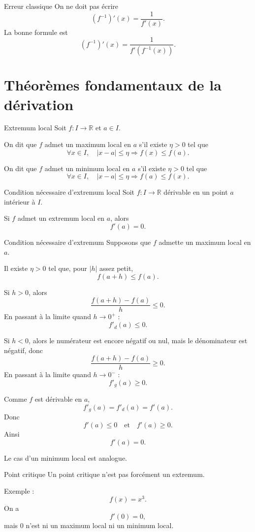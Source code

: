 \documentclass[11pt,a4paper]{article}
\newcommand{\R}{\mathbb{R}}
\begin{document}
\begin{warningbox}{Erreur classique}
On ne doit pas écrire
\[
(f^{-1})'(x)=\frac1{f'(x)}.
\]
La bonne formule est
\[
(f^{-1})'(x)=\frac1{f'(f^{-1}(x))}.
\]
\end{warningbox}

\section{Théorèmes fondamentaux de la dérivation}

\begin{definitionbox}{Extremum local}
Soit $f:I\to\R$ et $a\in I$.

On dit que $f$ admet un maximum local en $a$ s'il existe $\eta>0$ tel que
\[
\forall x\in I,\quad |x-a|\leq\eta \Longrightarrow f(x)\leq f(a).
\]

On dit que $f$ admet un minimum local en $a$ s'il existe $\eta>0$ tel que
\[
\forall x\in I,\quad |x-a|\leq\eta \Longrightarrow f(a)\leq f(x).
\]
\end{definitionbox}

\begin{theorembox}{Condition nécessaire d'extremum local}
Soit $f:I\to\R$ dérivable en un point $a$ intérieur à $I$.

Si $f$ admet un extremum local en $a$, alors
\[
f'(a)=0.
\]
\end{theorembox}

\begin{proofbox}{Condition nécessaire d'extremum}
Supposons que $f$ admette un maximum local en $a$.

Il existe $\eta>0$ tel que, pour $|h|$ assez petit,
\[
f(a+h)\leq f(a).
\]

Si $h>0$, alors
\[
\frac{f(a+h)-f(a)}{h}\leq0.
\]
En passant à la limite quand $h\to0^+$ :
\[
f'_d(a)\leq0.
\]

Si $h<0$, alors le numérateur est encore négatif ou nul, mais le dénominateur est négatif, donc
\[
\frac{f(a+h)-f(a)}{h}\geq0.
\]
En passant à la limite quand $h\to0^-$ :
\[
f'_g(a)\geq0.
\]

Comme $f$ est dérivable en $a$,
\[
f'_g(a)=f'_d(a)=f'(a).
\]
Donc
\[
f'(a)\leq0
\quad\text{et}\quad
f'(a)\geq0.
\]
Ainsi
\[
f'(a)=0.
\]

Le cas d'un minimum local est analogue.
\end{proofbox}

\begin{warningbox}{Point critique}
Un point critique n'est pas forcément un extremum.

Exemple :
\[
f(x)=x^3.
\]
On a
\[
f'(0)=0,
\]
mais $0$ n'est ni un maximum local ni un minimum local.
\end{warningbox}
\end{document}
